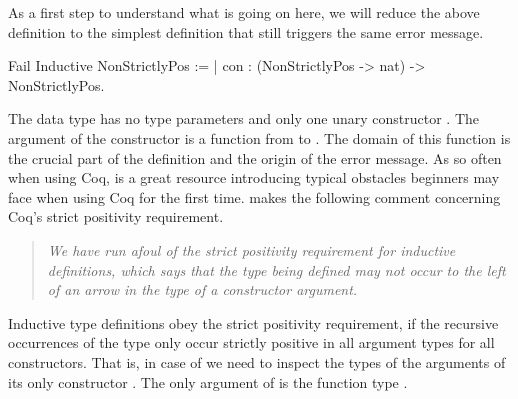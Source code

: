 As a first step to understand what is going on here, we will reduce the above definition to the simplest definition that still triggers the same error message.

\begin{coqcode}
Fail Inductive NonStrictlyPos :=
| con : (NonStrictlyPos -> nat) -> NonStrictlyPos.
\end{coqcode}

The data type  has no type parameters and only one unary constructor .
The argument of the constructor  is a function from  to .
The domain of this function is the crucial part of the definition and the origin of the error message.
As so often when using Coq, \citet{chlipala2013certified} is a great resource introducing typical obstacles beginners may face when using Coq for the first time.
\citeauthor{chlipala2013certified} makes the following comment concerning Coq's strict positivity requirement.

\begin{quote}
\emph{We have run afoul of the strict positivity requirement for inductive definitions, which says that the type being defined may not occur to the left of an arrow in the type of a constructor argument.}
\end{quote}

Inductive type definitions obey the strict positivity requirement, if the recursive occurrences of the type only occur strictly positive in all argument types for all constructors.
That is, in case of  we need to inspect the types of the arguments of its only constructor .
The only argument of  is the function type .

